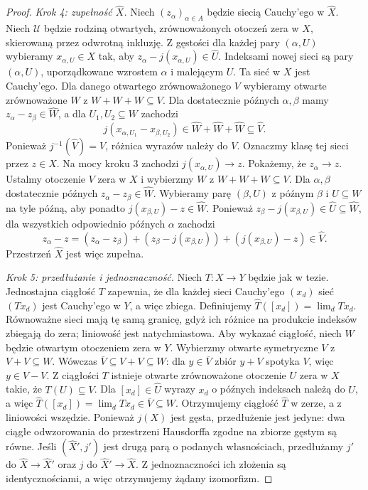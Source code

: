 \begin{proof}
\emph{Krok 4: zupełność $\widehat X$.}
Niech $(z_\alpha)_{\alpha\in A}$ będzie siecią Cauchy'ego
w $\widehat X$. Niech $\mathcal U$ będzie rodziną otwartych,
zrównoważonych otoczeń zera w $X$, skierowaną przez odwrotną
inkluzję. Z gęstości dla każdej pary $(\alpha,U)$ wybieramy
$x_{\alpha,U}\in X$ tak, aby
$z_\alpha-j(x_{\alpha,U})\in\widehat U$.
Indeksami nowej sieci są pary $(\alpha,U)$, uporządkowane
wzrostem $\alpha$ i malejącym $U$.
Ta sieć w $X$ jest Cauchy'ego. Dla danego otwartego
zrównoważonego $V$ wybieramy otwarte zrównoważone $W$
z $W+W+W\subseteq V$. Dla dostatecznie późnych
$\alpha,\beta$ mamy $z_\alpha-z_\beta\in\widehat W$,
a dla $U_1,U_2\subseteq W$ zachodzi
\[
 j(x_{\alpha,U_1}-x_{\beta,U_2})
 \in\widehat W+\widehat W+\widehat W
 \subseteq\widehat V.
\]
Ponieważ $j^{-1}(\widehat V)=V$, różnica wyrazów należy do $V$.
Oznaczmy klasę tej sieci przez $z\in\widehat X$.
Na mocy kroku 3 zachodzi $j(x_{\alpha,U})\to z$.
Pokażemy, że $z_\alpha\to z$. Ustalmy otoczenie
$V$ zera w $X$ i wybierzmy $W$ z $W+W+W\subseteq V$.
Dla $\alpha,\beta$ dostatecznie późnych
$z_\alpha-z_\beta\in\widehat W$.
Wybieramy parę $(\beta,U)$ z późnym $\beta$ i $U\subseteq W$
na tyle późną, aby ponadto
$j(x_{\beta,U})-z\in\widehat W$. Ponieważ
$z_\beta-j(x_{\beta,U})\in\widehat U\subseteq\widehat W$,
dla wszystkich odpowiednio późnych $\alpha$ zachodzi
\[
 z_\alpha-z=(z_\alpha-z_\beta)
 +(z_\beta-j(x_{\beta,U}))+(j(x_{\beta,U})-z)
 \in\widehat V.
\]
Przestrzeń $\widehat X$ jest więc zupełna.

\emph{Krok 5: przedłużanie i jednoznaczność.}
Niech $T:X\to Y$ będzie jak w tezie. Jednostajna ciągłość
$T$ zapewnia, że dla każdej sieci Cauchy'ego $(x_d)$
sieć $(Tx_d)$ jest Cauchy'ego w $Y$, a więc zbiega.
Definiujemy
$\widehat T([x_d])=\lim_d Tx_d$.
Równoważne sieci mają tę samą granicę, gdyż ich różnice
na produkcie indeksów zbiegają do zera; liniowość jest
natychmiastowa. Aby wykazać ciągłość, niech $W$ będzie
otwartym otoczeniem zera w $Y$. Wybierzmy otwarte
symetryczne $V$ z $V+V\subseteq W$. Wówczas
$\overline V\subseteq V+V\subseteq W$: dla $y\in\overline V$
zbiór $y+V$ spotyka $V$, więc $y\in V-V$.
Z ciągłości $T$ istnieje otwarte zrównoważone otoczenie
$U$ zera w $X$ takie, że $T(U)\subseteq V$.
Dla $[x_d]\in\widehat U$ wyrazy $x_d$ o późnych indeksach
należą do $U$, a więc
$\widehat T([x_d])=\lim_d Tx_d\in\overline V\subseteq W$.
Otrzymujemy ciągłość $\widehat T$ w zerze, a z liniowości
wszędzie. Ponieważ $j(X)$ jest gęsta, przedłużenie jest
jedyne: dwa ciągłe odwzorowania do przestrzeni Hausdorffa
zgodne na zbiorze gęstym są równe. Jeśli
$(\widehat X',j')$ jest drugą parą o podanych własnościach,
przedłużamy $j'$ do $\widehat X\to\widehat X'$ oraz $j$
do $\widehat X'\to\widehat X$. Z jednoznaczności ich
złożenia są identycznościami, a więc otrzymujemy żądany
izomorfizm.
\end{proof}

